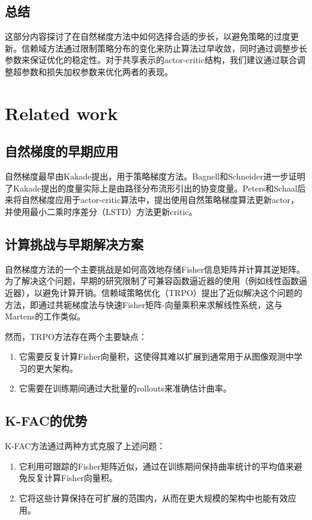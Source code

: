 \documentclass[twocolumn, 10pt]{article} %
\theoremstyle{remark}
\begin{document}
\subsection{总结}
这部分内容探讨了在自然梯度方法中如何选择合适的步长，以避免策略的过度更新。信赖域方法通过限制策略分布的变化来防止算法过早收敛，同时通过调整步长参数来保证优化的稳定性。对于共享表示的actor-critic结构，我们建议通过联合调整超参数和损失加权参数来优化两者的表现。

\section{Related work}

\subsection{自然梯度的早期应用}
自然梯度最早由Kakade提出，用于策略梯度方法。Bagnell和Schneider进一步证明了Kakade提出的度量实际上是由路径分布流形引出的协变度量。Peters和Schaal后来将自然梯度应用于actor-critic算法中，提出使用自然策略梯度算法更新actor，并使用最小二乘时序差分（LSTD）方法更新critic。

\subsection{计算挑战与早期解决方案}
自然梯度方法的一个主要挑战是如何高效地存储Fisher信息矩阵并计算其逆矩阵。为了解决这个问题，早期的研究限制了可兼容函数逼近器的使用（例如线性函数逼近器），以避免计算开销。信赖域策略优化（TRPO）提出了近似解决这个问题的方法，即通过共轭梯度法与快速Fisher矩阵-向量乘积来求解线性系统，这与Martens的工作类似。

然而，TRPO方法存在两个主要缺点：
\begin{enumerate}
    \item 它需要反复计算Fisher向量积，这使得其难以扩展到通常用于从图像观测中学习的更大架构。
    \item 它需要在训练期间通过大批量的rollouts来准确估计曲率。
\end{enumerate}

\subsection{K-FAC的优势}
K-FAC方法通过两种方式克服了上述问题：
\begin{enumerate}
    \item 它利用可跟踪的Fisher矩阵近似，通过在训练期间保持曲率统计的平均值来避免反复计算Fisher向量积。
    \item 它将这些计算保持在可扩展的范围内，从而在更大规模的架构中也能有效应用。
\end{enumerate}
\end{document}

